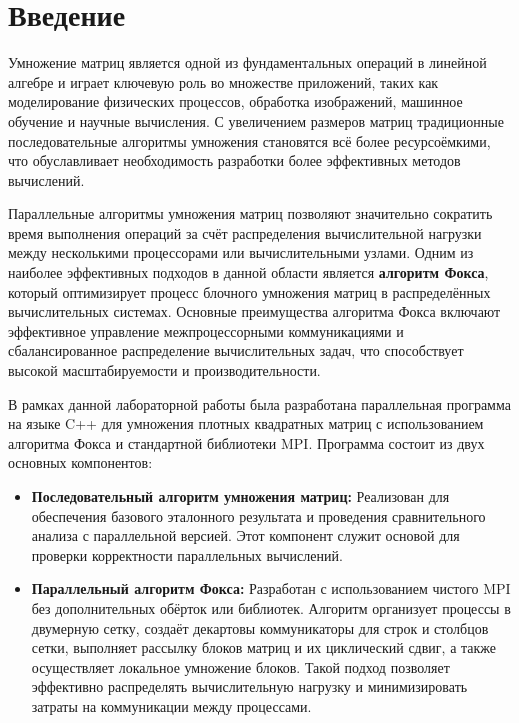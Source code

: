 \documentclass{report}
\begin{document}
\setcounter{page}{2}
\tableofcontents
\newpage

\section*{Введение}

Умножение матриц является одной из фундаментальных операций в линейной алгебре и играет ключевую роль во множестве приложений, таких как моделирование физических процессов, обработка изображений, машинное обучение и научные вычисления. С увеличением размеров матриц традиционные последовательные алгоритмы умножения становятся всё более ресурсоёмкими, что обуславливает необходимость разработки более эффективных методов вычислений.

Параллельные алгоритмы умножения матриц позволяют значительно сократить время выполнения операций за счёт распределения вычислительной нагрузки между несколькими процессорами или вычислительными узлами. Одним из наиболее эффективных подходов в данной области является \textbf{алгоритм Фокса}, который оптимизирует процесс блочного умножения матриц в распределённых вычислительных системах. Основные преимущества алгоритма Фокса включают эффективное управление межпроцессорными коммуникациями и сбалансированное распределение вычислительных задач, что способствует высокой масштабируемости и производительности.

В рамках данной лабораторной работы была разработана параллельная программа на языке C++ для умножения плотных квадратных матриц с использованием алгоритма Фокса и стандартной библиотеки MPI. Программа состоит из двух основных компонентов:

\begin{itemize}
    \item \textbf{Последовательный алгоритм умножения матриц:} Реализован для обеспечения базового эталонного результата и проведения сравнительного анализа с параллельной версией. Этот компонент служит основой для проверки корректности параллельных вычислений.
    
    \item \textbf{Параллельный алгоритм Фокса:} Разработан с использованием чистого MPI без дополнительных обёрток или библиотек. Алгоритм организует процессы в двумерную сетку, создаёт декартовы коммуникаторы для строк и столбцов сетки, выполняет рассылку блоков матриц и их циклический сдвиг, а также осуществляет локальное умножение блоков. Такой подход позволяет эффективно распределять вычислительную нагрузку и минимизировать затраты на коммуникации между процессами.
\end{itemize}
\end{document}
